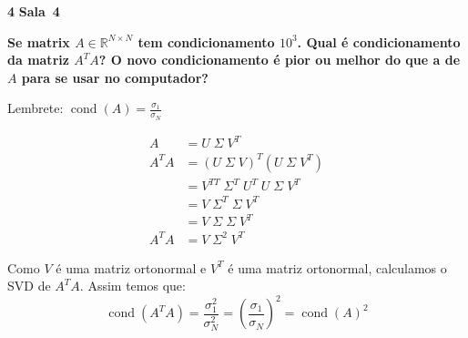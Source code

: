 \documentclass{article}
\newcommand{\R}{\mathbb{R}}
\DeclareMathOperator*{\cond}{cond}
\newenvironment{question}
    {\medskip\bfseries\large}
    {\medskip}
\newcounter{exe-list}
\newenvironment{exe}[2][Sala]
    {\bigskip\noindent\par\ifthenelse{\equal{#1}{}}%
        {\textbf{\LARGE #2}}%
        {\textbf{\LARGE #1~#2}}%
    \medskip\noindent\par}
    {\bigskip}
\begin{document}
\begin{exe}{4}
    \begin{question}
        Se matrix \(A \in \R^{N \times N}\)
        tem condicionamento \(10^3\).
        Qual é condicionamento da matriz \(A^T A\)?
        O novo condicionamento é pior ou melhor
        do que a de \(A\) para se usar no computador?

        \medskip

        Lembrete: \(\cond(A) = \frac{\sigma_1}{\sigma_N}\)
    \end{question}

    \begin{align*}
        A &= U \; \Sigma \; V^T \\
        A^T A &= (U \; \Sigma \; V)^T (U \; \Sigma \; V^T) \\
        &= V^{TT} \; \Sigma^T \; U^T \; U \; \Sigma \; V^T \\
        &= V \; \Sigma^T \; \Sigma \; V^T \\
        &= V \; \Sigma \; \Sigma \; V^T \\
        A^T A &= V \; \Sigma^2 \; V^T
    \end{align*}

    Como \(V\) é uma matriz ortonormal e
    \(V^T\) é uma matriz ortonormal,
    calculamos o SVD de \(A^T A\).
    Assim temos que:
    \[
        \cond(A^T A) = \frac{\sigma_1^2}{\sigma_N^2}
            = \left(\frac{\sigma_1}{\sigma_N}\right)^2
            = \cond(A)^2
    \]
\end{exe}
\end{document}
